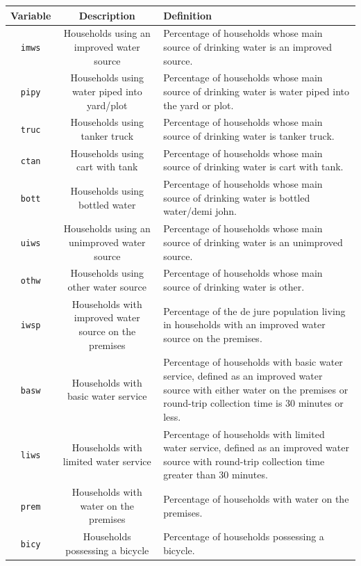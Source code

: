 \documentclass[10pt,twoside]{article}
\numberwithin{equation}{section}
\newcommand{\?}{\stackrel{?}{=}}
\begin{document}
\begin{table}[h!]
  \centering
  \begin{tabular}{c c m{5cm}}\toprule
    \bf Variable & \bf Description & \bf Definition \\\midrule
    \texttt{imws} & Households using an improved water source
 & Percentage of households whose main source of drinking water is an improved source.
 \\\hline
  \texttt{pipy} & Households using water piped into yard/plot
& Percentage of households whose main source of drinking water is water piped into the yard or plot.
\\\hline
 \texttt{truc} & Households using tanker truck & Percentage of households whose main source of drinking water is tanker truck.
\\\hline
 \texttt{ctan} & Households using cart with tank & Percentage of households whose main source of drinking water is cart with tank.
\\\hline
 \texttt{bott} & Households using bottled water & Percentage of households whose main source of drinking water is bottled water/demi john.
\\\hline
 \texttt{uiws} & Households using an unimproved water source & Percentage of households whose main source of drinking water is an unimproved source.
\\\hline
 \texttt{othw} & Households using other water source & Percentage of households whose main source of drinking water is other.
\\\hline
 \texttt{iwsp} & Households with improved water source on the premises & Percentage of the de jure population living in households with an improved water source on the premises.
\\\hline
 \texttt{basw} & Households with basic water service
 & Percentage of households with basic water service, defined as an improved water source with either water on the premises or round-trip collection time is 30 minutes or less.
\\\hline
 \texttt{liws} & Households with limited water service
 & Percentage of households with limited water service, defined as an improved water source with round-trip collection time greater than 30 minutes.
\\\hline
 \texttt{prem} & Households with water on the premises
 & Percentage of households with water on the premises.
\\\hline
 \texttt{bicy} & Households possessing a bicycle
 & Percentage of households possessing a bicycle.
\\\hline

\end{tabular}
\end{table}
\end{document}
